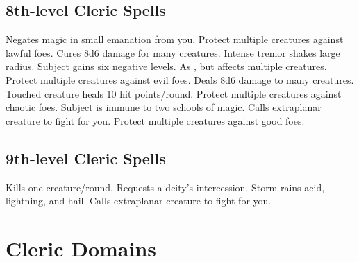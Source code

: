 \subsection{8th-level Cleric Spells}
\begin{spelllist}
   Negates magic in small emanation from you.
  \F Protect multiple creatures against lawful foes. 
   Cures 8d6 damage for many creatures.
   Intense tremor shakes large radius.
   Subject gains six negative levels.
   As , but affects multiple creatures.
  \F Protect multiple creatures against evil foes. 
   Deals 8d6 damage to many creatures.
   Touched creature heals 10 hit points/round.
  \F Protect multiple creatures against chaotic foes. 
   Subject is immune to two schools of magic.
   Calls extraplanar creature to fight for you.
  \F Protect multiple creatures against good foes. 
\end{spelllist}

\subsection{9th-level Cleric Spells}
\begin{spelllist}
   Kills one creature/round.
  \M Requests a deity's intercession.
   Storm rains acid, lightning, and hail.
   Calls extraplanar creature to fight for you.
\end{spelllist}

\section{Cleric Domains}  

\begin{comment}
\subsection{Example Domain}
\parhead{Domain Power}
\parhead{Channelled Domain Power}
\parhead{Greater Domain Power}
\parhead{Greater Channelled Domain Power}
\parhead{Domain Mastery}
\begin{spelllist}
  \spellhead[1]{}
  \spellhead[1]{}
  \spellhead[2]{}
  \spellhead[2]{}
  \spellhead[3]{}
  \spellhead[3]{}
  \spellhead[4]{}
  \spellhead[4]{}
  \spellhead[5]{}
  \spellhead[5]{}
  \spellhead[6]{}
  \spellhead[6]{}
  \spellhead[7]{}
  \spellhead[7]{}
  \spellhead[8]{}
  \spellhead[8]{}
  \spellhead[9]{}
  \spellhead[9]{}
\end{spelllist}
\end{comment}


